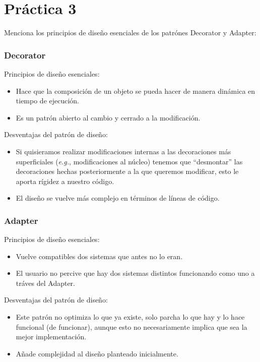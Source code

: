 \documentclass{article}
\begin{document}

\section*{\LARGE{Práctica 3}}
Menciona los principios de diseño esenciales de los patrónes Decorator y Adapter:

\subsubsection*{Decorator}

Principios de diseño esenciales:
\newcommand{\localtextbulletone}{\textcolor{black}{\raisebox{.45ex}{\rule{.6ex}{.6ex}}}}
\renewcommand{\labelitemi}{\localtextbulletone}
\begin{itemize}
\item Hace que la composición de un objeto se pueda hacer de manera dinámica en tiempo de ejecución.
\item Es un patrón abierto al cambio y cerrado a la modificación.
\end{itemize}

Desventajas del patrón de diseño:
\begin{itemize}
\item Si quisieramos realizar modificaciones internas a las decoraciones más superficiales
  (\textit{e.g.}, modificaciones al núcleo) tenemos que ``desmontar'' las decoraciones hechas
  posteriormente a la que queremos modificar, esto le aporta rígidez a nuestro código.
\item El diseño se vuelve más complejo en términos de líneas de código.
\end{itemize}

\subsubsection*{Adapter}

Principios de diseño esenciales:
\begin{itemize}
\item Vuelve compatibles dos sistemas que antes no lo eran.
\item El usuario no percive que hay dos sistemas distintos funcionando como uno a tráves del Adapter.
\end{itemize}

Desventajas del patrón de diseño:
\begin{itemize}
\item Este patrón no optimiza lo que ya existe, solo parcha lo que hay y lo hace funcional (de funcionar),
  aunque esto no necesariamente implica que sea la mejor implementación.
\item Añade complejidad al diseño planteado inicialmente.
\end{itemize}
\end{document}
